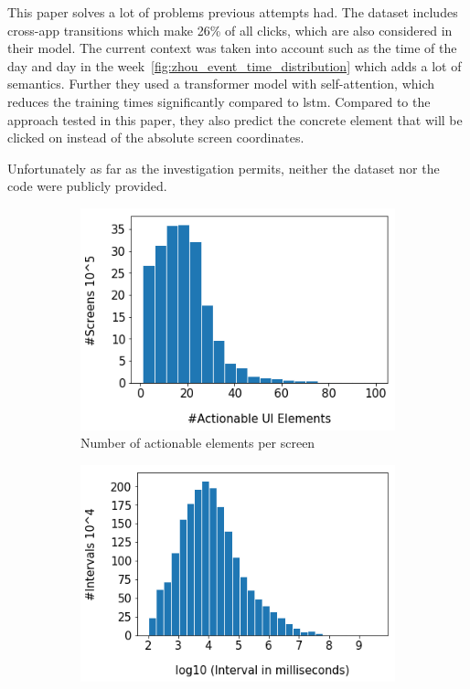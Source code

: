 This paper solves a lot of problems previous attempts had.
The dataset includes cross-app transitions which make 26\% of all clicks, which are also considered in their model.
The current context was taken into account such as the time of the day and day in the week~\ref{fig:zhou_event_time_distribution} which adds a lot of semantics.
Further they used a transformer model with self-attention, which reduces the training times significantly compared to \gls{lstm}.
Compared to the approach tested in this paper, they also predict the concrete element that will be clicked on instead of the absolute screen coordinates.

Unfortunately as far as the investigation permits, neither the dataset nor the code were publicly provided.

\begin{figure}[htbp!]
  \centering
  \begin{subfigure}[b]{0.3\textwidth}
    \centering
    \includegraphics[width=\textwidth]{graphics/zhou_actionable_elements}
    \caption{Number of actionable elements per screen}
    \label{fig:zhou_actionable_elements}
  \end{subfigure}
  \hfill
  \begin{subfigure}[b]{0.3\textwidth}
    \centering
    \includegraphics[width=\textwidth]{graphics/zhou_event_time_intervals}

\end{subfigure}
\end{figure}
